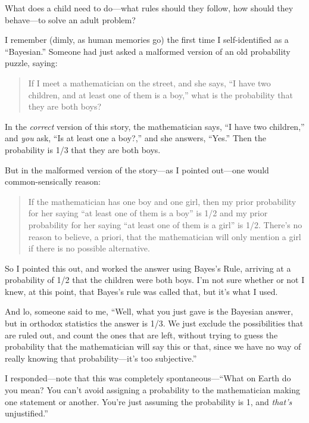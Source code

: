 {
 What does a child need to do---what rules should they follow, how
should they behave---to solve an adult problem?}

\myendsectiontext


{
 I remember (dimly, as human memories go) the first time I
self-identified as a ``Bayesian.''
Someone had just asked a malformed version of an old probability
puzzle, saying:}

\begin{quote}
{
 If I meet a mathematician on the street, and she says,
``I have two children, and at least one of them is a
boy,'' what is the probability that they are both
boys?}
\end{quote}

{
 In the \textit{correct} version of this story, the mathematician
says, ``I have two children,'' and
\textit{you} ask, ``Is at least one a
boy?,'' and she answers,
``Yes.'' Then the probability is 1/3
that they are both boys.}

{
 But in the malformed version of the story---as I pointed out---one
would common-sensically reason:}

\begin{quote}
{
 If the mathematician has one boy and one girl, then my prior
probability for her saying ``at least one of them is a
boy'' is 1/2 and my prior probability for her saying
``at least one of them is a girl''
is 1/2. There's no reason to believe, a priori, that
the mathematician will only mention a girl if there is no possible
alternative.}
\end{quote}

{
 So I pointed this out, and worked the answer using
Bayes's Rule, arriving at a probability of 1/2 that the
children were both boys. I'm not sure whether or not I
knew, at this point, that Bayes's rule was called that,
but it's what I used.}

{
 And lo, someone said to me, ``Well, what you just
gave is the Bayesian answer, but in orthodox statistics the answer is
1/3. We just exclude the possibilities that are ruled out, and count
the ones that are left, without trying to guess the probability that
the mathematician will say this or that, since we have no way of really
knowing that probability---it's too
subjective.''}

{
 I responded---note that this was completely
spontaneous---``What on Earth do you mean? You
can't avoid assigning a probability to the
mathematician making one statement or another. You're
just assuming the probability is 1, and \textit{that's}
unjustified.''}

